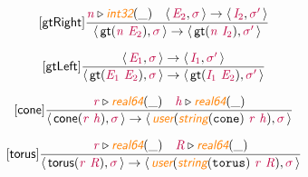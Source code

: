 \documentclass[10pt,leqno,fleqn]{article}
\newcommand{\artVariable}[1]{\mbox{\color{purple}\em #1\/}}
\newcommand{\artConstructor}[1]{\mbox{\sf #1}}
\newcommand{\artCaseInsensitiveLiteral}[1]{\mbox{\tt #1}}
\newcommand{\artSpecial}[1]{\mbox{\color{orange}\sf\em #1}}
\begin{document}
\begin{equation}
\tag*{[\artConstructor{\sf gtRight}]}
\begin{split}\frac{ \artVariable{n}\triangleright \artSpecial{int32}(\_) \quad \langle\, \artVariable{E$_{2}$}, \artVariable{$\sigma$}\,\rangle \rightarrow \langle\, \artVariable{I$_{2}$}, \artVariable{$\sigma$\/$^\prime$}\,\rangle }{\langle\, \artConstructor{\sf gt}(\artVariable{n}\ \artVariable{E$_{2}$}), \artVariable{$\sigma$}\,\rangle \rightarrow \langle\, \artConstructor{\sf gt}(\artVariable{n}\ \artVariable{I$_{2}$}), \artVariable{$\sigma$\/$^\prime$}\,\rangle }
\end{split}
\end{equation}

\begin{equation}
\tag*{[\artConstructor{\sf gtLeft}]}
\begin{split}\frac{\langle\, \artVariable{E$_{1}$}, \artVariable{$\sigma$}\,\rangle \rightarrow \langle\, \artVariable{I$_{1}$}, \artVariable{$\sigma$\/$^\prime$}\,\rangle }{\langle\, \artConstructor{\sf gt}(\artVariable{E$_{1}$}\ \artVariable{E$_{2}$}), \artVariable{$\sigma$}\,\rangle \rightarrow \langle\, \artConstructor{\sf gt}(\artVariable{I$_{1}$}\ \artVariable{E$_{2}$}), \artVariable{$\sigma$\/$^\prime$}\,\rangle }
\end{split}
\end{equation}

\begin{equation}
\tag*{[\artConstructor{\sf cone}]}
\begin{split}\frac{ \artVariable{r}\triangleright \artSpecial{real64}(\_) \quad  \artVariable{h}\triangleright \artSpecial{real64}(\_) }{\langle\, \artConstructor{\sf cone}(\artVariable{r}\ \artVariable{h}), \artVariable{$\sigma$}\,\rangle \rightarrow \langle\, \artSpecial{user}(\artSpecial{string}(\artCaseInsensitiveLiteral{cone})\ \artVariable{r}\ \artVariable{h}), \artVariable{$\sigma$}\,\rangle }
\end{split}
\end{equation}

\begin{equation}
\tag*{[\artConstructor{\sf torus}]}
\begin{split}\frac{ \artVariable{r}\triangleright \artSpecial{real64}(\_) \quad  \artVariable{R}\triangleright \artSpecial{real64}(\_) }{\langle\, \artConstructor{\sf torus}(\artVariable{r}\ \artVariable{R}), \artVariable{$\sigma$}\,\rangle \rightarrow \langle\, \artSpecial{user}(\artSpecial{string}(\artCaseInsensitiveLiteral{torus})\ \artVariable{r}\ \artVariable{R}), \artVariable{$\sigma$}\,\rangle }
\end{split}
\end{equation}
\end{document}
